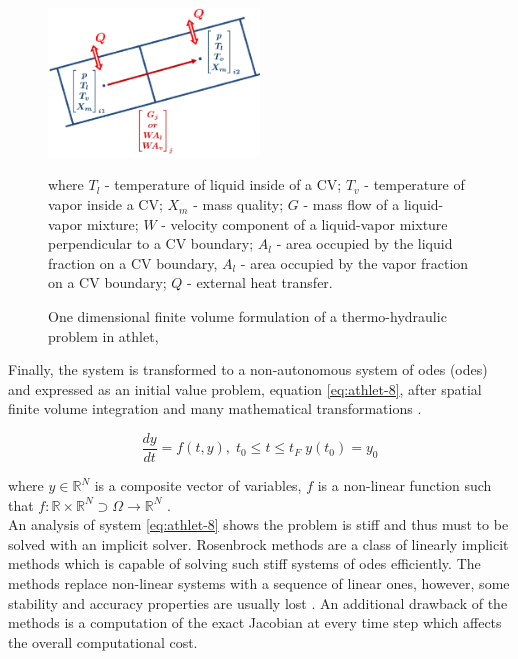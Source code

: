 \figpointer{\ref{fig:introduction-1d-fvm}}
\begin{figure}[htpb]
  \centering
  \includegraphics[width=0.5\textwidth]{figures/introduction-1d-fvm.png}
\caption{One dimensional finite volume formulation of a thermo-hydraulic problem in \acrshort{athlet}, \cite{tims-presentation}}
\vspace{3mm}
where $T_l$ - temperature of liquid inside of a CV; $T_v$ - temperature of vapor inside a CV; $X_m$ - mass quality; $G$ - mass flow of a liquid-vapor mixture; $W$ - velocity component of a liquid-vapor mixture perpendicular to a CV boundary; $A_l$ - area occupied by the liquid fraction on a CV boundary, $A_l$ - area occupied by the vapor fraction on a CV boundary; $Q$ - external heat transfer.
\label{fig:introduction-1d-fvm}
\end{figure}


Finally, the system is transformed to a non-autonomous system of \acrlong{ode}s (\acrshort{ode}s) and expressed as an initial value problem, equation \ref{eq:athlet-8}, after spatial finite volume integration and many mathematical transformations \cite{lt:ATHLMaM}. 


\begin{equation} \label{eq:athlet-8}
	\frac{dy}{dt} = f(t,y), \;  t_{0} \leq t \leq t_{F} \; y(t_{0}) = y_{0}
\end{equation}

where $y \in \mathbb{R}^{N}$ is a composite vector of variables, $f$ is a non-linear function such that $f : \mathbb{R} \times \mathbb{R}^{N} \supset \Omega  \rightarrow \mathbb{R}^{N}$  .\\


An analysis of system \ref{eq:athlet-8} shows the problem is stiff and thus must to be solved with an implicit solver. Rosenbrock methods are a class of linearly implicit methods which is capable of solving such stiff systems of \acrshort{ode}s efficiently. The methods replace non-linear systems with a sequence of linear ones, however, some stability and accuracy properties are usually lost \cite{blom2013rosenbrock}. An additional drawback of the methods is a computation of the exact Jacobian at every time step which affects the overall computational cost.\\


